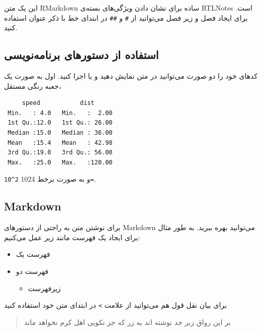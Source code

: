\documentclass[
]{article}
\providecommand{\tightlist}{%
  \setlength{\itemsep}{0pt}\setlength{\parskip}{0pt}}
\begin{document}
این یک متن RMarkdown ساده برای نشان دادن ویژگی‌های بسته‌ی RTLNotes است.
برای ایجاد فصل و زیر فصل می‌توانید از ‍‍‍‍‍‍\texttt{\#} و \texttt{\#\#}
در ابتدای خط با ذکر عنوان استفاده کنید.

\hypertarget{ux627ux633ux62aux641ux627ux62fux647-ux627ux632-ux62fux633ux62aux648ux631ux647ux627ux6cc-ux628ux631ux646ux627ux645ux647ux646ux648ux6ccux633ux6cc}{%
\subsection{استفاده از دستورهای
برنامه‌نویسی}\label{ux627ux633ux62aux641ux627ux62fux647-ux627ux632-ux62fux633ux62aux648ux631ux647ux627ux6cc-ux628ux631ux646ux627ux645ux647ux646ux648ux6ccux633ux6cc}}

کدهای خود را دو صورت می‌توانید در متن نمایش دهید و یا اجرا کنید. اول به
صورت یک جعبه رنگی مستقل،

\begin{verbatim}
     speed           dist       
 Min.   : 4.0   Min.   :  2.00  
 1st Qu.:12.0   1st Qu.: 26.00  
 Median :15.0   Median : 36.00  
 Mean   :15.4   Mean   : 42.98  
 3rd Qu.:19.0   3rd Qu.: 56.00  
 Max.   :25.0   Max.   :120.00  
\end{verbatim}

و به صورت برخط 1024 \texttt{2\^{}10=}.

\hypertarget{markdown}{%
\subsection{Markdown}\label{markdown}}

برای نوشتن متن به راحتی از دستورهای Markdown می‌توانید بهره ببرید. به
طور مثال برای ایجاد یک فهرست مانند زیر عمل می‌کنیم:

\begin{itemize}
\tightlist
\item
  فهرست یک
\item
  فهرست دو

  \begin{itemize}
  \tightlist
  \item
    زیرفهرست
  \end{itemize}
\end{itemize}

برای بیان نقل قول هم می‌توانید از علامت \texttt{\textgreater{}} در
ابتدای متن خود استفاده کنید

\begin{quote}
بر این رواق زبر جد نوشته اند به زر که جز نکویی اهل کرم نخواهد ماند
\end{quote}
\end{document}
